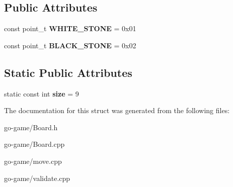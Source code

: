 \subsection*{Public Attributes}
\begin{DoxyCompactItemize}
\item 
\mbox{\label{struct_board_ae0bb0088207d143f51e1904949bc67cb}} 
const point\+\_\+t {\bfseries W\+H\+I\+T\+E\+\_\+\+S\+T\+O\+NE} = 0x01
\item 
\mbox{\label{struct_board_a0a08db92e8e9d6cf8130073d018b4428}} 
const point\+\_\+t {\bfseries B\+L\+A\+C\+K\+\_\+\+S\+T\+O\+NE} = 0x02
\end{DoxyCompactItemize}
\subsection*{Static Public Attributes}
\begin{DoxyCompactItemize}
\item 
\mbox{\label{struct_board_a93850e71a40327203e34c4ac6d824b3c}} 
static const int {\bfseries size} = 9
\end{DoxyCompactItemize}


The documentation for this struct was generated from the following files\+:\begin{DoxyCompactItemize}
\item 
go-\/game/Board.\+h\item 
go-\/game/Board.\+cpp\item 
go-\/game/move.\+cpp\item 
go-\/game/validate.\+cpp\end{DoxyCompactItemize}
